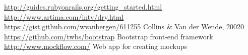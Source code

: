\begin{thebibliography}{99999}
\singlespace\normalsize

 \url{http://guides.rubyonrails.org/getting_started.html}
 \url{http://www.artima.com/intv/dry.html}
 \url{https://gist.github.com/wvanbergen/611255}
 Collins \& Van der Wende, 20020
 \url{https://github.com/twbs/bootstrap} Bootstrap front-end framework
 \url{http://www.mockflow.com/} Web app for creating mockups

\end{thebibliography}